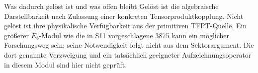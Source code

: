 \begin{grenze}{Was dadurch gelöst ist und was offen bleibt}
Gelöst ist die algebraische Darstellbarkeit nach Zulassung einer konkreten Tensorproduktkopplung. Nicht gelöst ist ihre physikalische Verfügbarkeit aus der primitiven TFPT-Quelle. Ein größerer $E_8$-Modul wie die in S11 vorgeschlagene 3875 kann ein möglicher Forschungsweg sein; seine Notwendigkeit folgt nicht aus dem Sektorargument. Die dort genannte Verzweigung und ein tatsächlich geeigneter Aufzeichnungsoperator in diesem Modul sind hier nicht geprüft.
\end{grenze}
